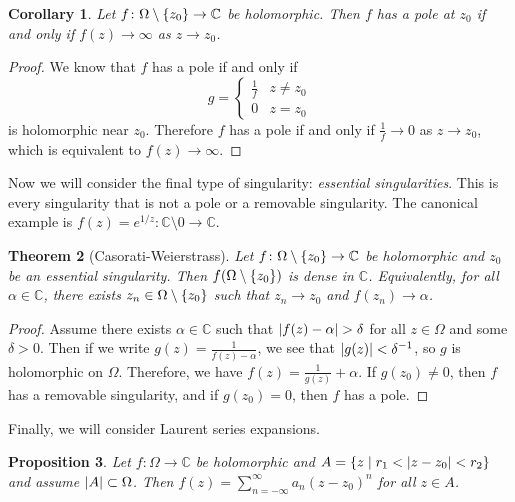 \documentclass[leqno, openany]{memoir}
\newtheorem{thm}{Theorem}[section]
\newtheorem{cor}[thm]{Corollary}
\newtheorem{prop}[thm]{Proposition}
\theoremstyle{definition}
\theoremstyle{remark}
\theoremstyle{plain}
\theoremstyle{definition}
\theoremstyle{remark}
\newcommand{\C}{\mathbb{C}}
\begin{document}
\begin{cor}
    Let $f \colon \Omega \setminus \qty{z_0} \to \C$ be holomorphic. Then $f$ has a pole at $z_0$ if and only if $f(z) \to \infty$ as $z \to z_0$.
\end{cor}

\begin{proof}
    We know that $f$ has a pole if and only if 
    \[ g = \begin{cases}
        \frac{1}{f} & z \neq z_0 \\
        0 & z = z_0
    \end{cases} \]
    is holomorphic near $z_0$. Therefore $f$ has a pole if and only if $\frac{1}{f} \to 0$ as $z \to z_0$, which is equivalent to $f(z) \to \infty$.
\end{proof}

Now we will consider the final type of singularity: \textit{essential singularities}. This is every singularity that is not a pole or a removable singularity. The canonical example is $f(z) = e^{1/z} \colon \C \setminus \qty{0} \to \C$.

\begin{thm}[Casorati-Weierstrass]
    Let $f \colon \Omega \setminus \qty{z_0} \to \C$ be holomorphic and $z_0$ be an essential singularity. Then $f(\Omega \setminus \qty{z_0})$ is dense in $\C$. Equivalently, for all $\alpha \in \C$, there exists $z_n \in \Omega \setminus \qty{z_0}$ such that $z_n \to z_0$ and $f(z_n) \to \alpha$.
\end{thm}

\begin{proof}
    Assume there exists $\alpha \in \C$ such that $\abs{f(z) - \alpha} > \delta$ for all $z \in \Omega$ and some $\delta > 0$. Then if we write $g(z) = \frac{1}{f(z) - \alpha}$, we see that $\abs{g(z)} < \delta^{-1}$, so $g$ is holomorphic on $\Omega$. Therefore, we have $f(z) = \frac{1}{g(z)} + \alpha$. If $g(z_0) \neq 0$, then $f$ has a removable singularity, and if $g(z_0) = 0$, then $f$ has a pole.
\end{proof}

Finally, we will consider Laurent series expansions.

\begin{prop}
    Let $f \colon \Omega \to \C$ be holomorphic and $A = \qty{z \mid r_1 < \abs{z-z_0} < r_2}$ and assume $\abs{A} \subset \Omega$. Then $f(z) = \sum_{n = -\infty}^{\infty} a_n {(z-z_0)}^n$ for all $z \in A$.
\end{prop}
\end{document}
